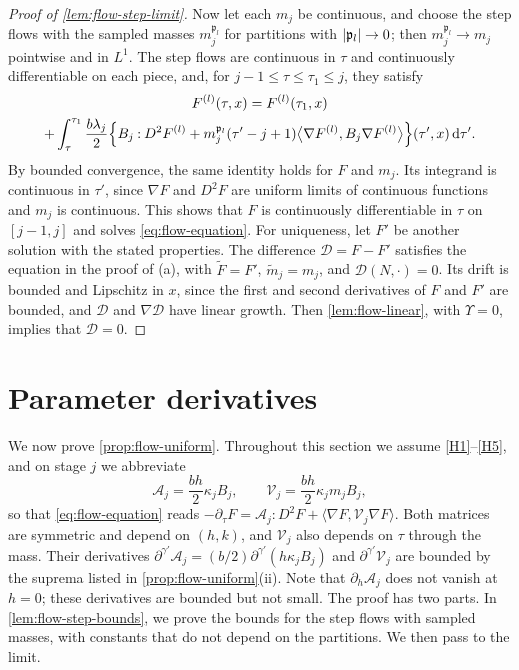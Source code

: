 \begin{proof}[Proof of \cref{lem:flow-step-limit}]
Now let each $m_j$ be continuous, and choose the step flows with the sampled
masses $m_j^{\mathfrak p_l}$ for partitions with $\lvert \mathfrak p_l\rvert\to0$; then
$m_j^{\mathfrak p_l}\to m_j$ pointwise and in $L^1$. The step flows are
continuous in $\tau$ and continuously differentiable on each piece, and, for
$j-1\le\tau\le\tau_1\le j$, they satisfy
\begin{multline*}
 F^{(l)}(\tau,x)=F^{(l)}(\tau_1,x)\\
 +\int_\tau^{\tau_1}\frac{b\lambda_j}{2}
 \Bigl\{B_j\mathbin{:}D^2F^{(l)}+m_j^{\mathfrak p_l}(\tau'-j+1)
 \bigl\langle\nabla F^{(l)},B_j\nabla F^{(l)}\bigr\rangle\Bigr\}(\tau',x)\,\mathrm d\tau'.
\end{multline*}
By bounded convergence, the same identity holds for $F$ and $m_j$. Its integrand
is continuous in $\tau'$, since $\nabla F$ and $D^2F$ are uniform limits of
continuous functions and $m_j$ is continuous. This shows that $F$ is
continuously differentiable in $\tau$ on $[j-1,j]$ and solves
\eqref{eq:flow-equation}. For uniqueness, let $F'$ be another solution with the
stated properties. The difference $\mathcal D=F-F'$ satisfies the equation in
the proof of (a), with $\widetilde F=F'$, $\widetilde m_j=m_j$, and
$\mathcal D(N,\cdot)=0$. Its drift is bounded and Lipschitz in $x$, since the first
and second derivatives of $F$ and $F'$ are bounded, and $\mathcal D$ and
$\nabla\mathcal D$ have linear growth.
Then \cref{lem:flow-linear}, with $\Upsilon=0$, implies that $\mathcal D=0$.
\end{proof}

\section{Parameter derivatives}\label{sec:flow-parameters}

We now prove \cref{prop:flow-uniform}. Throughout this section we assume
\ref{H1}--\ref{H5}, and on stage $j$ we abbreviate
\[
 \mathcal A_j=\frac{bh}{2}\kappa_jB_j,\qquad
 \mathcal V_j=\frac{bh}{2}\kappa_jm_jB_j,
\]
so that \eqref{eq:flow-equation} reads
$-\partial_\tau F=\mathcal A_j\mathbin{:}D^2F+\langle\nabla F,\mathcal V_j\nabla F\rangle$.
Both matrices are symmetric and depend on $(h,k)$, and $\mathcal V_j$ also depends
on $\tau$ through the mass. Their derivatives
$\partial^{\gamma'}\mathcal A_j=(b/2)\partial^{\gamma'}(h\kappa_jB_j)$ and
$\partial^{\gamma'}\mathcal V_j$ are bounded by the suprema listed in
\cref{prop:flow-uniform}(ii). Note that $\partial_h\mathcal A_j$ does not vanish
at $h=0$; these derivatives are bounded but not small. The proof has two
parts. In \cref{lem:flow-step-bounds}, we prove the bounds for the step flows
with sampled masses, with constants that do not depend on the partitions. We
then pass to the limit.

